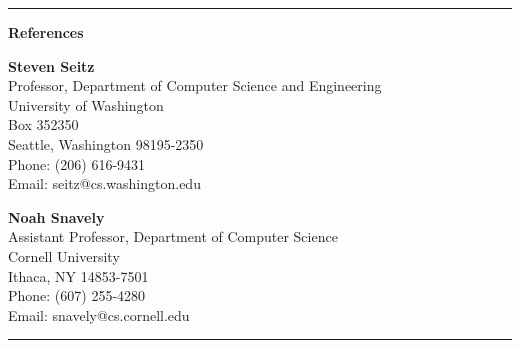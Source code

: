\documentclass[11pt]{article}
\newenvironment{itemize*}%
  {\begin{itemize}%
    \setlength{\itemsep}{0pt}%
    \setlength{\parskip}{0pt}%
	}
  {\end{itemize}}
\begin{document}
\rule{\textwidth}{2pt}
{\large \textbf{References}}
\begin{itemize*}
\item
\textbf{Steven Seitz}\\
Professor, Department of Computer Science and Engineering\\
University of Washington\\
Box 352350\\
Seattle, Washington 98195-2350\\
Phone: (206) 616-9431\\
Email: seitz@cs.washington.edu\\
\vspace{0.1in}
\item
\textbf{Noah Snavely}\\
Assistant Professor, Department of Computer Science\\
Cornell University\\
Ithaca, NY 14853-7501\\
Phone: (607) 255-4280\\
Email: snavely@cs.cornell.edu\\
\end{itemize*}
\rule{\textwidth}{2pt}
\end{document}
